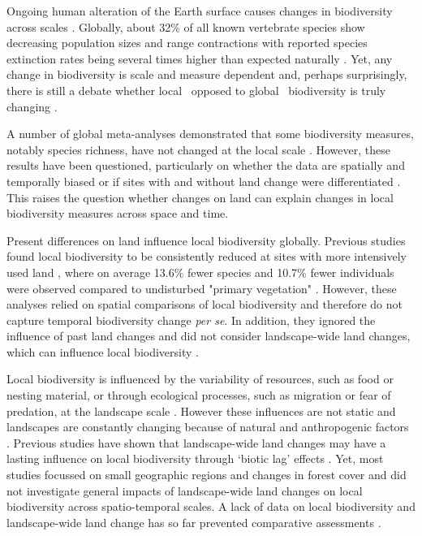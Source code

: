 Ongoing human alteration of the Earth surface causes changes in biodiversity across scales \citep{Gibson2011,Murphy2014,Newbold2015}. Globally, about 32\% of all known vertebrate species show decreasing population sizes and range contractions \citep{Ceballos2017,WWF2018} with reported species extinction rates being several times higher than expected naturally \citep{Brooks2002,Pimm2014}. Yet, any change in biodiversity is scale and measure dependent \citep{Sax2003,Chase2013} and, perhaps surprisingly, there is still a debate whether local \textendash\ opposed to global \textendash\ biodiversity is truly changing \citep{Thomas2013,McGill2014}. 

A number of global meta-analyses demonstrated that some biodiversity measures, notably species richness, have not changed at the local scale \citep{Vellend2013,Vellend2017,Dornelas2014}. However, these results have been questioned, particularly on whether the data are spatially and temporally biased \citep{Gonzalez2016} or if sites with and without land change were differentiated \citep{Cardinale2018}. This raises the question whether changes on land can explain changes in local biodiversity measures across space and time. 

Present differences on land influence local biodiversity globally. Previous studies found local biodiversity to be consistently reduced at sites with more intensively used land \citep{Murphy2014,Newbold2015,Alroy2017}, where on average 13.6\% fewer species and 10.7\% fewer individuals were observed compared to undisturbed "primary vegetation" \citep{Newbold2015}. However, these analyses relied on spatial comparisons of local biodiversity and therefore do not capture temporal biodiversity change \textit{per se}. In addition, they ignored the influence of past land changes \citep{Perring2018,Jung2018} and did not consider landscape-wide land changes, which can influence local biodiversity \citep{Tscharntke2012,Turner2015,Miguet2015}. 

Local biodiversity is influenced by the variability of resources, such as food or nesting material, or through ecological processes, such as migration or fear of predation, at the landscape scale \citep{Hanski2000,Chase2003,Turner2015,Fernandez2016}. However these influences are not static and landscapes are constantly changing because of natural and anthropogenic factors \citep{Pickett1985,Manning2009,Turner2015}. Previous studies have shown that landscape-wide land changes may have a lasting influence on local biodiversity through ‘biotic lag’ effects \citep{Metzger2009,Ewers2013}. Yet, most studies focussed on small geographic regions and changes in forest cover \citep{Rittenhouse2010} and did not investigate general impacts of landscape-wide land changes on local biodiversity across spatio-temporal scales. A lack of data on local biodiversity and landscape-wide land change has so far prevented comparative assessments \citep{DePalma2018}.

